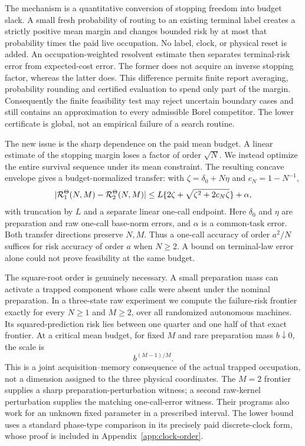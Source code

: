 The mechanism is a quantitative conversion of stopping freedom into budget slack. A small fresh probability of routing to an existing terminal label creates a strictly positive mean margin and changes bounded risk by at most that probability times the paid live occupation. No label, clock, or physical reset is added. An occupation-weighted resolvent estimate then separates terminal-risk error from expected-cost error. The former does not acquire an inverse stopping factor, whereas the latter does. This difference permits finite report averaging, probability rounding and certified evaluation to spend only part of the margin. Consequently the finite feasibility test may reject uncertain boundary cases and still contains an approximation to every admissible Borel competitor. The lower certificate is global, not an empirical failure of a search routine.

The new issue is the sharp dependence on the paid mean budget. A linear estimate of the stopping margin loses a factor of order $\sqrt N$. We instead optimize the entire survival sequence under its mean constraint. The resulting concave envelope gives a budget-normalized transfer: with $\zeta=\delta_0+N\eta$ and $c_N=1-N^{-1}$,
\[
 |\mathcal R_1^\Theta(N,M)-\mathcal R_2^\Theta(N,M)|
 \le L\{2\zeta+\sqrt{\zeta^2+2c_N\zeta}\}+\alpha,
\]
with truncation by $L$ and a separate linear one-call endpoint. Here $\delta_0$ and $\eta$ are preparation and raw one-call base-norm errors, and $\alpha$ is a common-task error. Both transfer directions preserve $N,M$. Thus a one-call accuracy of order $a^2/N$ suffices for risk accuracy of order $a$ when $N\ge2$. A bound on terminal-law error alone could not prove feasibility at the same budget.

The square-root order is genuinely necessary. A small preparation mass can activate a trapped component whose calls were absent under the nominal preparation. In a three-state raw experiment we compute the failure-risk frontier exactly for every $N\ge1$ and $M\ge2$, over all randomized autonomous machines. Its squared-prediction risk lies between one quarter and one half of that exact frontier. At a critical mean budget, for fixed $M$ and rare preparation mass $b\downarrow0$, the scale is
\[
 b^{(M-1)/M}.
\]
This is a joint acquisition--memory consequence of the actual trapped occupation, not a dimension assigned to the three physical coordinates. The $M=2$ frontier supplies a sharp preparation-perturbation witness; a second raw-kernel perturbation supplies the matching one-call-error witness. Their programs also work for an unknown fixed parameter in a prescribed interval. The lower bound uses a standard phase-type comparison in its precisely paid discrete-clock form, whose proof is included in Appendix~\ref{app:clock-order}.

